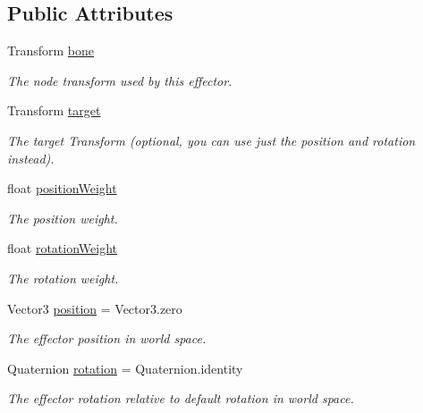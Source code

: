 \subsection*{Public Attributes}
\begin{DoxyCompactItemize}
\item 
Transform \mbox{\hyperlink{class_root_motion_1_1_final_i_k_1_1_i_k_effector_afaafca7ed961d8697dc0d673871a9f7d}{bone}}
\begin{DoxyCompactList}\small\item\em The node transform used by this effector. \end{DoxyCompactList}\item 
Transform \mbox{\hyperlink{class_root_motion_1_1_final_i_k_1_1_i_k_effector_af489d67b5329c6f7ca15b27e497cf0b5}{target}}
\begin{DoxyCompactList}\small\item\em The target Transform (optional, you can use just the position and rotation instead). \end{DoxyCompactList}\item 
float \mbox{\hyperlink{class_root_motion_1_1_final_i_k_1_1_i_k_effector_a0e404e3d964a2d69ff07c6d0f19fa983}{position\+Weight}}
\begin{DoxyCompactList}\small\item\em The position weight. \end{DoxyCompactList}\item 
float \mbox{\hyperlink{class_root_motion_1_1_final_i_k_1_1_i_k_effector_affd9fe48e2afabdda7c544c63ee5fb9f}{rotation\+Weight}}
\begin{DoxyCompactList}\small\item\em The rotation weight. \end{DoxyCompactList}\item 
Vector3 \mbox{\hyperlink{class_root_motion_1_1_final_i_k_1_1_i_k_effector_a3ed027b3d54e6afa83aa3f293e84f629}{position}} = Vector3.\+zero
\begin{DoxyCompactList}\small\item\em The effector position in world space. \end{DoxyCompactList}\item 
Quaternion \mbox{\hyperlink{class_root_motion_1_1_final_i_k_1_1_i_k_effector_a0c7ce32b40c63dab3ac9ef177caf1758}{rotation}} = Quaternion.\+identity
\begin{DoxyCompactList}\small\item\em The effector rotation relative to default rotation in world space. \end{DoxyCompactList}\item 

\end{DoxyCompactItemize}
